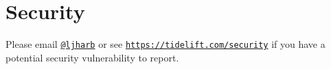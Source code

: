 \chapter{Security }
\hypertarget{md__c_1_2xampp_2htdocs_2_g_pagos_ayuntamiento_2node__modules_2resolve_2_s_e_c_u_r_i_t_y}{}\label{md__c_1_2xampp_2htdocs_2_g_pagos_ayuntamiento_2node__modules_2resolve_2_s_e_c_u_r_i_t_y}
\label{md__c_1_2xampp_2htdocs_2_g_pagos_ayuntamiento_2node__modules_2resolve_2_s_e_c_u_r_i_t_y_autotoc_md6041}%
%


Please email \href{https://github.com/ljharb}{\texttt{@ljharb}} or see \href{https://tidelift.com/security}{\texttt{https\+://tidelift.\+com/security}} if you have a potential security vulnerability to report. 